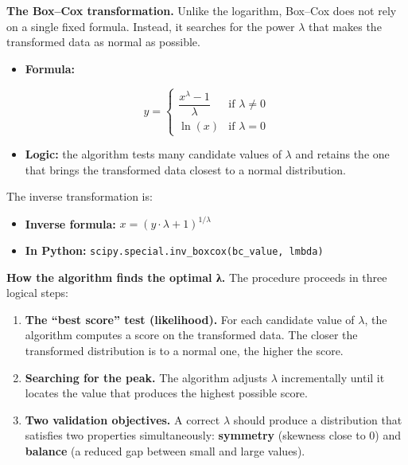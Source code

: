 \textbf{The Box--Cox transformation.} Unlike the logarithm, Box--Cox
does not rely on a single fixed formula. Instead, it searches for the
power \(\lambda\) that makes the transformed data as normal as possible.

\begin{itemize}
\tightlist
\item
  \textbf{Formula:}
\end{itemize}

\[y = \begin{cases} \dfrac{x^\lambda - 1}{\lambda} & \text{if } \lambda \neq 0 \\ \ln(x) & \text{if } \lambda = 0 \end{cases}\]

\begin{itemize}
\tightlist
\item
  \textbf{Logic:} the algorithm tests many candidate values of
  \(\lambda\) and retains the one that brings the transformed data
  closest to a normal distribution.
\end{itemize}

The inverse transformation is:

\begin{itemize}
\tightlist
\item
  \textbf{Inverse formula:} \(x = (y \cdot \lambda + 1)^{1/\lambda}\)
\item
  \textbf{In Python:}
  \texttt{scipy.special.inv\_boxcox(bc\_value,\ lmbda)}
\end{itemize}

\textbf{How the algorithm finds the optimal λ.} The procedure proceeds
in three logical steps:

\begin{enumerate}
\def\labelenumi{\arabic{enumi}.}
\tightlist
\item
  \textbf{The ``best score'' test (likelihood).} For each candidate
  value of \(\lambda\), the algorithm computes a score on the
  transformed data. The closer the transformed distribution is to a
  normal one, the higher the score.
\item
  \textbf{Searching for the peak.} The algorithm adjusts \(\lambda\)
  incrementally until it locates the value that produces the highest
  possible score.
\item
  \textbf{Two validation objectives.} A correct \(\lambda\) should
  produce a distribution that satisfies two properties simultaneously:
  \textbf{symmetry} (skewness close to 0) and \textbf{balance} (a
  reduced gap between small and large values).
\end{enumerate}

